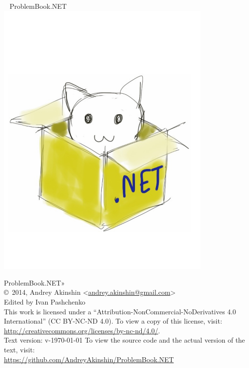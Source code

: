 \begin{center}
~\vspace{4cm}\newline
{\Huge{ProblemBook.NET}}
\includegraphics[width=0.8\textwidth]{cover}
\end{center}
\newpage

\hbox{}
\vfill
{
\noindent
ProblemBook.NET»\\
\copyright\ 2014, Andrey Akinshin <\href{mailto:andrey.akinshin@gmail.com}{andrey.akinshin@gmail.com}>\\
Edited by Ivan Pashchenko\\

\medskip
\noindent
This work is licensed under a ``Attribution-NonCommercial-NoDerivatives 4.0 International'' (CC BY-NC-ND 4.0). To view a copy of this license, visit:\\ \url{http://creativecommons.org/licenses/by-nc-nd/4.0/}.\\
Text version: v-\versiondate\today \newline
To view the source code and the actual version of the text, visit:\\ \url{https://github.com/AndreyAkinshin/ProblemBook.NET}
}
\newpage